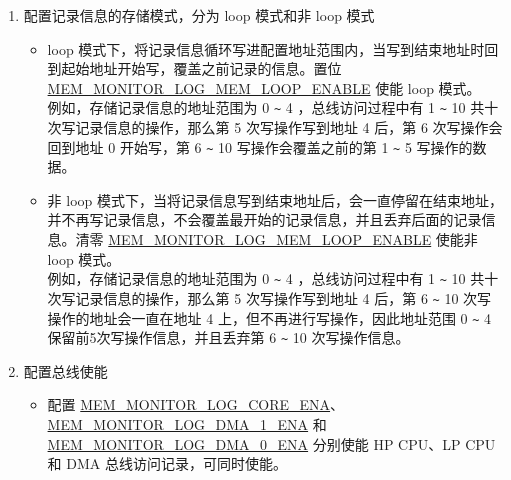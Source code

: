 \documentclass[main\_\_CN.tex]{subfiles}
\begin{document}
\begin{enumerate}
\begin{itemize}
            \item \hyperref[regdesc:MEMMONITORLOGMEMSTARTREG]{MEM\_MONITOR\_LOG\_MEM\_START\_REG} 和 \hyperref[regdesc:MEMMONITORLOGMEMENDREG]{MEM\_MONITOR\_LOG\_MEM\_END\_REG} 为存储地址范围配置寄存器。 记录信息的存储地址范围为 0x4080\_0000 \verb+~+ 0x4085\_FFFF。
            \item 置位 \hyperref[regdesc:MEMMONITORLOGMEMADDRUPDATEREG]{MEM\_MONITOR\_LOG\_MEM\_ADDR\_UPDATE\_REG}，使 \hyperref[regdesc:MEMMONITORLOGMEMCURRENTADDRREG]{MEM\_MONITOR\_LOG\_MEM\_CURRENT\_ADDR\_REG} 更新为 \hyperref[regdesc:MEMMONITORLOGMEMSTARTREG]{MEM\_MONITOR\_LOG\_MEM\_START\_REG}。
            \item 配置辅助调试模块对 HP SRAM 的使用权限，只有开启了辅助调试模块对 HP SRAM 的使用权限才能访问 HP SRAM。关于如何配置，详情见章节 \ref{mod:permctrl} \textit{}。
        \end{itemize}
    \item \label{other:dbgassist-item-log-config-step5} 配置记录信息的存储模式，分为 loop 模式和非 loop 模式
        \begin{itemize}
            \item loop 模式下，将记录信息循环写进配置地址范围内，当写到结束地址时回到起始地址开始写，覆盖之前记录的信息。置位 \hyperref[fielddesc:MEMMONITORLOGMEMLOOPENABLE]{MEM\_MONITOR\_LOG\_MEM\_LOOP\_ENABLE} 使能 loop 模式。\\
            例如，存储记录信息的地址范围为 0 \verb+~+ 4 ，总线访问过程中有 1 \verb+~+ 10 共十次写记录信息的操作，那么第 5 次写操作写到地址 4 后，第 6 次写操作会回到地址 0 开始写，第 6 \verb+~+ 10 写操作会覆盖之前的第 1 \verb+~+ 5 写操作的数据。
            \item 非 loop 模式下，当将记录信息写到结束地址后，会一直停留在结束地址，并不再写记录信息，不会覆盖最开始的记录信息，并且丢弃后面的记录信息。清零 \hyperref[fielddesc:MEMMONITORLOGMEMLOOPENABLE]{MEM\_MONITOR\_LOG\_MEM\_LOOP\_ENABLE} 使能非 loop 模式。\\
            例如，存储记录信息的地址范围为 0 \verb+~+ 4 ，总线访问过程中有 1 \verb+~+ 10 共十次写记录信息的操作，那么第 5 次写操作写到地址 4 后，第 6 \verb+~+ 10 次写操作的地址会一直在地址 4 上，但不再进行写操作，因此地址范围 0 \verb+~+ 4 保留前5次写操作信息，并且丢弃第 6 \verb+~+ 10 次写操作信息。
        \end{itemize}
     \item 配置总线使能
        \begin{itemize}
            \item 配置 \hyperref[fielddesc:MEMMONITORLOGCOREENA]{MEM\_MONITOR\_LOG\_CORE\_ENA}、\hyperref[fielddesc:MEMMONITORLOGDMA1ENA]{MEM\_MONITOR\_LOG\_DMA\_1\_ENA} 和 \hyperref[fielddesc:MEMMONITORLOGDMA0ENA]{MEM\_MONITOR\_LOG\_DMA\_0\_ENA} 分别使能 HP CPU、LP CPU 和 DMA 总线访问记录，可同时使能。
        \end{itemize}
\end{enumerate}
\end{document}
